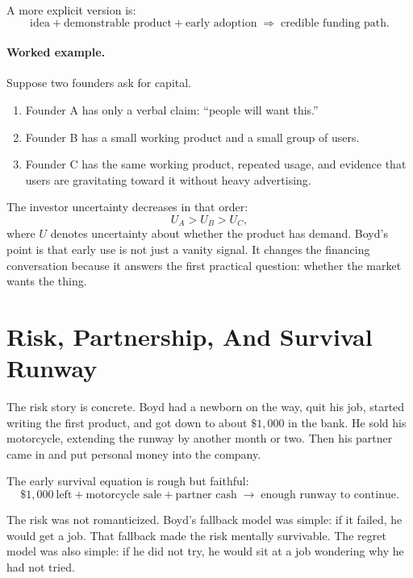A more explicit version is:
\begin{equation}
\text{idea}
+
\text{demonstrable product}
+
\text{early adoption}
\;\Longrightarrow\;
\text{credible funding path}.
\end{equation}

\paragraph{Worked example.}
Suppose two founders ask for capital.

\begin{enumerate}
\item Founder A has only a verbal claim: ``people will want this.''
\item Founder B has a small working product and a small group of users.
\item Founder C has the same working product, repeated usage, and evidence that users are gravitating toward it without heavy advertising.
\end{enumerate}

The investor uncertainty decreases in that order:
\begin{equation}
U_A > U_B > U_C,
\end{equation}
where \(U\) denotes uncertainty about whether the product has demand. Boyd's point is that early use is not just a vanity signal. It changes the financing conversation because it answers the first practical question: whether the market wants the thing.

\section{Risk, Partnership, And Survival Runway}

The risk story is concrete. Boyd had a newborn on the way, quit his job, started writing the first product, and got down to about \(\$1{,}000\) in the bank. He sold his motorcycle, extending the runway by another month or two. Then his partner came in and put personal money into the company.

The early survival equation is rough but faithful:
\begin{equation}
\$1{,}000\ \text{left}
+
\text{motorcycle sale}
+
\text{partner cash}
\;\longrightarrow\;
\text{enough runway to continue}.
\end{equation}

The risk was not romanticized. Boyd's fallback model was simple: if it failed, he would get a job. That fallback made the risk mentally survivable. The regret model was also simple: if he did not try, he would sit at a job wondering why he had not tried.

